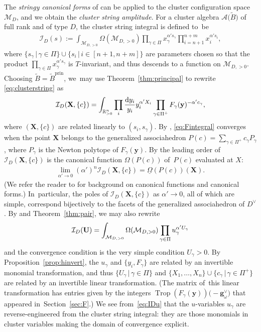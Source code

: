 \documentclass[pdftex]{sigma}%
\def\R{{\mathbb R}}
\def\A{{\mathcal{A}}}
\def\prin{{\operatorname{prin}}}
\def\tB{{\tilde B}}
\def\I{{\mathcal{I}}}
\def\M{{\mathcal{M}}}
\def\tB{{\tilde B}}
\def\y{{\mathbf y}}
\def\X{{\mathbf X}}
\def\Trop{\operatorname{Trop}}
\def\g{{\mathbf g}}
\numberwithin{equation}{section}
\begin{document}
\bigskip{} %
The \emph{stringy canonical forms} of \cite{AHL} can be applied to the cluster configuration space $\M_D$, and we obtain the \emph{cluster string amplitude}.
For a cluster algebra $\A\big(\tB\big)$ of full rank and of type $D$, the cluster string integral is defined to~be
\begin{gather}\label{eq:clusterstring}
\I_D(s):= \int_{\M_{D,>0}} \Omega(\M_{D,>0}) \prod_{\gamma \in \Pi} x_\gamma^{\alpha' s_\gamma}\prod_{i=n+1}^{n+m} x_i^{\alpha' s_i},
\end{gather}
where $\{s_\gamma \,|\, \gamma \in \Pi\} \cup \{s_i \,|\, i \in [n+1,n+m]\}$
are parameters chosen so that the product $\prod_{\gamma \in \Pi} x_\gamma^{\alpha' s_\gamma}$
is $T$-invariant, and thus descends to a function on $\M_{D,>0}$. Choosing $\tB = \tB^\prin$, we~may use Theorem~\ref{thm:principal} to rewrite \eqref{eq:clusterstring} as
\begin{gather}\label{eq:Fintegral}
\I_D(\X,\{c\}) = \int_{\R_{>0}^n} \prod_i \frac{{\rm d}y_i}{y_i} y_i^{\alpha' X_i} \prod_{\gamma \in \Pi^+} F_\gamma(\y)^{-\alpha' c_\gamma},
\end{gather}
where $(\X,\{c\})$ are related linearly to $(s_i,s_\gamma)$. By \cite[Claim 2]{AHL}, \eqref{eq:Fintegral} converges when the point $\X$ belongs to the generalized associahedron $P(c)= \sum_{\gamma \in \Pi^+} c_\gamma P_\gamma$, where $P_\gamma$ is the Newton polytope of $F_\gamma(\y)$. By \cite[Claim 2]{AHL} the leading order of $\I_D(\X,\{c\})$ is the canonical function $\Omega(P(c))$ of~$P(c)$ evaluated at $X$:
\begin{gather*}
\lim_{\alpha' \to 0} (\alpha')^n \I_D(\X,\{c\}) = \underline{\Omega}(P(c))(\X).
\end{gather*}
(We refer the reader to \cite{ABL, AHL} for background on canonical functions and canonical forms.)
In~particular, the poles of $\I_D(\X,\{c\})$ as $\alpha' \to 0$, all of which are simple, correspond bijectively to the facets of the generalized associahedron of $D^\vee$. By \cite[Section~9]{AHL} and Theorem~\ref{thm:pair}, we may also rewrite
\begin{gather} \label{eq:IDu}
\I_D({\bf U}) = \int_{\M_{D,>0}} \Omega(\M_{D,>0}) \prod_{\gamma \in \Pi} u_\gamma^{\alpha'U_\gamma}
\end{gather}
and the convergence condition is the very simple condition $U_\gamma >0$. By Proposition~\ref{prop:hinvert}, the $u_\gamma$ and $\{y_i, F_\gamma\}$ are related by an invertible monomial transformation, and thus $\{U_\gamma \,|\, \gamma \in \Pi\}$ and $\{X_1,\dots,X_n\} \cup \{c_\gamma \,|\, \gamma \in \Pi^+\}$ are related by an invertible linear transformation. (The matrix of~this linear transformation has entries given by the integers $\Trop(F_\gamma(\y))\big({-}\g^\vee_\omega\big)$ that appeared in~Section~\ref{sec:F}.) We see from~\eqref{eq:IDu} that the $u$-variables $u_\gamma$ are reverse-engineered from the cluster string integral: they are those monomials in cluster variables making the domain of convergence explicit.
\end{document}
